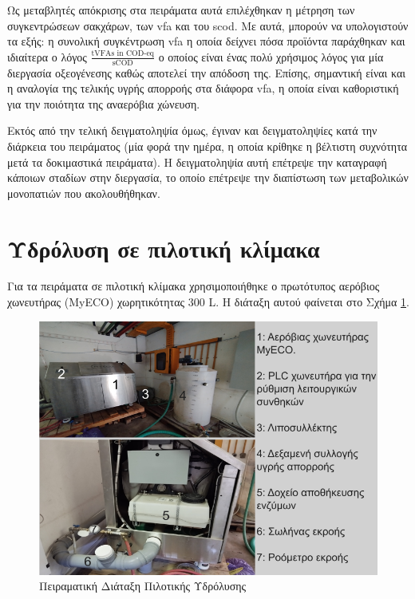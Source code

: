 \documentclass[11pt]{report}
\begin{document}
Ως μεταβλητές απόκρισης στα πειράματα αυτά επιλέχθηκαν η μέτρηση των συγκεντρώσεων σακχάρων, των \acrshort{vfa} και του \acrshort{scod}.  Με αυτά, μπορούν να υπολογιστούν τα εξής: η συνολική συγκέντρωση \acrshort{vfa} η οποία δείχνει πόσα προϊόντα παράχθηκαν και ιδιαίτερα ο λόγος \(\frac{\text{tVFAs in COD-eq}}{\text{sCOD}}\) ο οποίος είναι ένας πολύ χρήσιμος λόγος για μία διεργασία οξεογένεσης καθώς αποτελεί την απόδοση της. Επίσης, σημαντική είναι και η αναλογία της τελικής υγρής απορροής στα διάφορα \acrshort{vfa}, η οποία είναι καθοριστική για την ποιότητα της αναερόβια χώνευση.

Εκτός από την τελική δειγματοληψία όμως, έγιναν και δειγματοληψίες κατά την διάρκεια του πειράματος (μία φορά την ημέρα, η οποία κρίθηκε η βέλτιστη συχνότητα μετά τα δοκιμαστικά πειράματα). Η δειγματοληψία αυτή επέτρεψε την καταγραφή κάποιων σταδίων στην διεργασία, το οποίο επέτρεψε την διαπίστωση των μεταβολικών μονοπατιών που ακολουθήθηκαν.

\section{Υδρόλυση σε πιλοτική κλίμακα}
\label{sec:org9cd55ea}
\label{sec:pilot-exp}

Για τα πειράματα σε πιλοτική κλίμακα χρησιμοποιήθηκε ο πρωτότυπος αερόβιος χωνευτήρας (MyECO) χωρητικότητας 300 L. Η διάταξη αυτού φαίνεται στο Σχήμα \ref{fig:org88da989}.

\begin{figure}[htbp]
\centering
\includegraphics[width=.9\linewidth]{./pilot_hydrolysis_captioned.png}
\caption{\label{fig:org88da989}Πειραματική Διάταξη Πιλοτικής Υδρόλυσης}
\end{figure}
\end{document}
